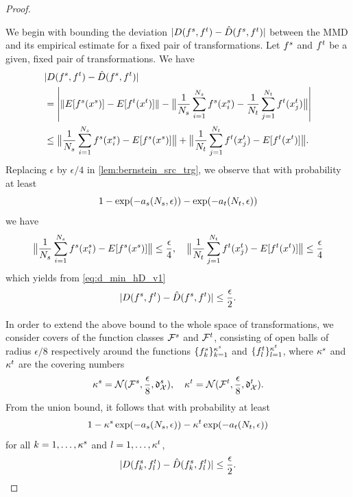 \documentclass[review,supplement,onefignum,onetabnum]{siamonline250211}
\begin{document}
\begin{proof}
\label{pf_lem_unif_bnd_D_hD}

We begin with bounding the deviation $| D(f^s, f^t) - \hat{D} (f^s, f^t)  | $ between the MMD and its empirical estimate for a fixed pair of transformations. Let $f^s$ and $f^t$ be a given, fixed pair of transformations. We have
%
\begin{equation}
\label{eq:d_min_hD_v1}
\begin{split}
& | D(f^s,f^t) - \hat{D}(f^s,f^t) | \\
&= \left |  \|  E[f^s(x^s)] - E[ f^t(x^t) ] \|  
- \big \|
\frac{1}{N_s} \sum_{i=1}^{N_s} f^s(x^s_i) -  \frac{1}{N_t} \sum_{j=1}^{N_t} f^t(x^t_j) 
\big \|
\right | \\
& \leq 
\big \|    
\frac{1}{N_s} \sum_{i=1}^{N_s} f^s(x^s_i) - E[f^s(x^s)] 
    \big \|
    + 
    \big \|    
\frac{1}{N_t} \sum_{j=1}^{N_t} f^t(x^t_j)  - E[ f^t(x^t) ]
    \big \|.
\end{split}
\end{equation}
%
Replacing $\epsilon$ by $\epsilon/4$ in \cref{lem:bernstein_src_trg}, we observe that with probability at least
%
\begin{equation*}
1 - \exp(-a_s(N_s, \epsilon)) - \exp(-a_t(N_t, \epsilon))
\end{equation*}
%
we have
%
\begin{equation*}
\begin{split}
\big \|    
\frac{1}{N_s} \sum_{i=1}^{N_s} f^s(x^s_i) - E[f^s(x^s)] 
    \big \| \leq \frac{\epsilon}{4}, 
    \quad
    \big \|    
\frac{1}{N_t} \sum_{j=1}^{N_t} f^t(x^t_j)  - E[ f^t(x^t) ]
    \big \|  \leq \frac{\epsilon}{4}
\end{split}
\end{equation*}
%
which yields from \eqref{eq:d_min_hD_v1}
% 
\begin{equation*}
| D(f^s,f^t) - \hat{D}(f^s,f^t) |  \leq \frac{\epsilon}{2}.
\end{equation*}
%

In order to extend the above bound to the whole space of transformations, we consider covers of the function classes $\mathcal{F}^s$ and $\mathcal{F}^t$, consisting of open balls of radius $\epsilon/8$ respectively  around the functions $\{ f^s_k \}_{k=1}^{\kappa^s}$ and $\{ f^t_l \}_{l=1}^{\kappa^t}$, where $\kappa^s$ and $\kappa^t$ are the covering numbers
%
\begin{equation*}
\kappa^s = \mathcal{N}(\mathcal{F}^s, \frac{\epsilon}{8}, \mathfrak{d}^s_{\mathcal{X}} ), 
\quad
\kappa^t = \mathcal{N}(\mathcal{F}^t, \frac{\epsilon}{8}, \mathfrak{d}^t_{\mathcal{X}} ).
\end{equation*}
%
From the union bound, it follows that with probability at least 
%
\begin{equation*}
1 - \kappa^s \exp(-a_s(N_s, \epsilon)) - \kappa^t \exp(-a_t(N_t, \epsilon))
\end{equation*}
%
for all $k=1, \dots, \kappa^s$ and $l=1, \dots, \kappa^t$,
%
\begin{equation}
\label{eq:bnd_D_hD_fsk_ftl}
\begin{split}
| D(f^s_k,f^t_l) - \hat{D}(f^s_k,f^t_l) |  \leq \frac{\epsilon}{2}.
\end{split}
\end{equation}
%


\end{proof}
\end{document}
